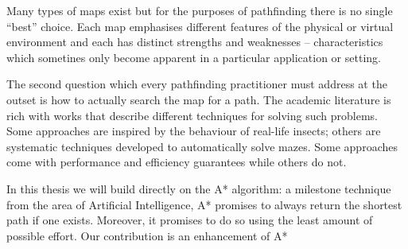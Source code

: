 %
Many types of maps exist but for the purposes of pathfinding there is no single ``best'' choice.
Each map emphasises different features of the physical or virtual environment and each has distinct strengths 
and weaknesses -- characteristics which sometines only become apparent in a particular application 
or setting.

The second question which every pathfinding practitioner must address at the outset is how
to actually search the map for a path. The academic literature is rich with works that describe different 
techniques for solving such problems. Some approaches are inspired by the behaviour of real-life
insects; others are systematic techniques developed to automatically solve mazes. Some approaches
come with performance and efficiency guarantees while others do not. 

In this thesis we will build directly on the A{*} algorithm: a milestone technique from the area 
of Artificial Intelligence, A{*} promises to always return the shortest path if one exists. Moreover, 
it promises to do so using the least amount of possible effort. Our contribution is an
enhancement of A{*}

